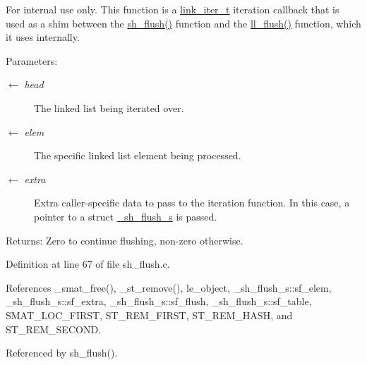 \begin{Desc}
\item[For internal use only.]
This function is a \hyperlink{group__dbprim__link_ga2}{link\_\-iter\_\-t} iteration callback that is used as a shim between the \hyperlink{dbprim_8h_a178}{sh\_\-flush()} function and the \hyperlink{group__dbprim__link_ga11}{ll\_\-flush()} function, which it uses internally.

\begin{Desc}
\item[Parameters:]
\begin{description}
\item[\mbox{$\leftarrow$} {\em head}]The linked list being iterated over. \item[\mbox{$\leftarrow$} {\em elem}]The specific linked list element being processed. \item[\mbox{$\leftarrow$} {\em extra}]Extra caller-specific data to pass to the iteration function. In this case, a pointer to a struct \hyperlink{struct__sh__flush__s}{\_\-sh\_\-flush\_\-s} is passed.\end{description}
\end{Desc}
\begin{Desc}
\item[Returns:]Zero to continue flushing, non-zero otherwise.\end{Desc}
\end{Desc}


Definition at line 67 of file sh\_\-flush.c.

References \_\-smat\_\-free(), \_\-st\_\-remove(), le\_\-object, \_\-sh\_\-flush\_\-s::sf\_\-elem, \_\-sh\_\-flush\_\-s::sf\_\-extra, \_\-sh\_\-flush\_\-s::sf\_\-flush, \_\-sh\_\-flush\_\-s::sf\_\-table, SMAT\_\-LOC\_\-FIRST, ST\_\-REM\_\-FIRST, ST\_\-REM\_\-HASH, and ST\_\-REM\_\-SECOND.

Referenced by sh\_\-flush().

